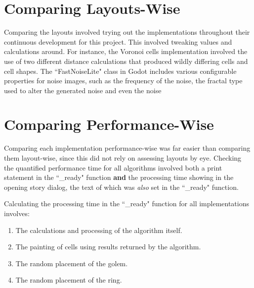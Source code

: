 \section{Comparing Layouts-Wise}

Comparing the layouts involved trying out the implementations throughout their continuous development for this project. This involved tweaking values and calculations around. For instance, the Voronoi cells implementation involved the use of two different distance calculations that produced wildly differing cells and cell shapes. The ``FastNoiseLite" class in Godot includes various configurable properties for noise images, such as the frequency of the noise, the fractal type used to alter the generated noise and even the noise 

\section{Comparing Performance-Wise}

Comparing each implementation performance-wise was far easier than comparing them layout-wise, since this did not rely on assessing layouts by eye. Checking the quantified performance time for all algorithms involved both a print statement in the ``\_ready" function \textbf{and} the processing time showing in the opening story dialog, the text of which was \textit{also} set in the ``\_ready" function.

Calculating the processing time in the ``\_ready" function for all implementations involves:

\begin{enumerate}
    \item The calculations and processing of the algorithm itself.
    \item The painting of cells using results returned by the algorithm.
    \item The random placement of the golem.
    \item The random placement of the ring.
\end{enumerate}

